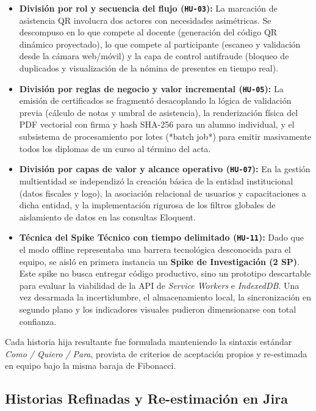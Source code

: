 \begin{itemize}
    \item \textbf{División por rol y secuencia del flujo (\texttt{HU-03}):} La marcación de asistencia QR involucra dos actores con necesidades asimétricas. Se descompuso en lo que compete al docente (generación del código QR dinámico proyectado), lo que compete al participante (escaneo y validación desde la cámara web/móvil) y la capa de control antifraude (bloqueo de duplicados y visualización de la nómina de presentes en tiempo real).
    \item \textbf{División por reglas de negocio y valor incremental (\texttt{HU-05}):} La emisión de certificados se fragmentó desacoplando la lógica de validación previa (cálculo de notas y umbral de asistencia), la renderización física del PDF vectorial con firma y hash SHA-256 para un alumno individual, y el subsistema de procesamiento por lotes (*batch job*) para emitir masivamente todos los diplomas de un curso al término del acta.
    \item \textbf{División por capas de valor y alcance operativo (\texttt{HU-07}):} En la gestión multientidad se independizó la creación básica de la entidad institucional (datos fiscales y logo), la asociación relacional de usuarios y capacitaciones a dicha entidad, y la implementación rigurosa de los filtros globales de aislamiento de datos en las consultas Eloquent.
    \item \textbf{Técnica del Spike Técnico con tiempo delimitado (\texttt{HU-11}):} Dado que el modo offline representaba una barrera tecnológica desconocida para el equipo, se aisló en primera instancia un \textbf{Spike de Investigación (2 SP)}. Este spike no busca entregar código productivo, sino un prototipo descartable para evaluar la viabilidad de la API de \textit{Service Workers} e \textit{IndexedDB}. Una vez desarmada la incertidumbre, el almacenamiento local, la sincronización en segundo plano y los indicadores visuales pudieron dimensionarse con total confianza.
\end{itemize}

Cada historia hija resultante fue formulada manteniendo la sintaxis estándar \textit{Como / Quiero / Para}, provista de criterios de aceptación propios y re-estimada en equipo bajo la misma baraja de Fibonacci.

\subsection{Historias Refinadas y Re-estimación en Jira}

